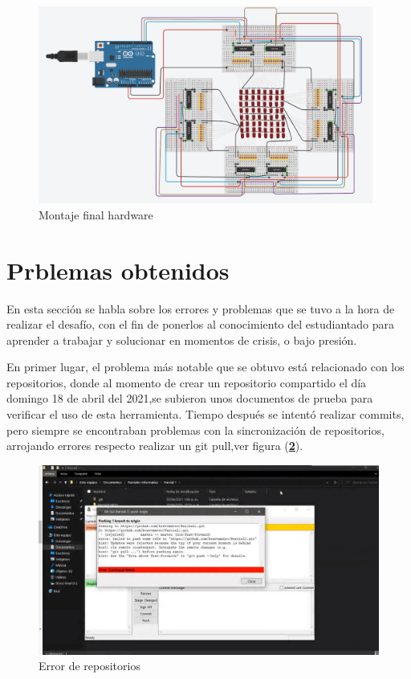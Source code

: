 \documentclass{article}
\begin{document}
    \begin{figure}[h]
    \includegraphics[width=11cm]{monaje.jpeg}
    \centering
    \caption{Montaje final hardware}
    \label{circuito}
    \end{figure}


\section{Prblemas obtenidos}\label{problem}
En esta sección se habla sobre los errores y problemas que se tuvo a la hora de realizar el desafío, con el fin de ponerlos al conocimiento del estudiantado para aprender a trabajar y solucionar en momentos de crisis, o bajo presión.

En primer lugar, el problema más notable que se obtuvo está relacionado con los repositorios, donde al momento de crear un repositorio compartido el día domingo 18 de abril del 2021,se subieron unos documentos de prueba para verificar el uso de esta herramienta. Tiempo después se intentó  realizar commits, pero siempre se encontraban problemas con la sincronización de repositorios, arrojando errores respecto realizar un git pull,ver figura (\textbf{\ref{repoerror}}).

    \begin{figure}[h]
    \includegraphics[width=15cm]{Error1.jpeg}
    \centering
    \caption{Error de repositorios}
    \label{repoerror}
    \end{figure}
    
\end{document}
